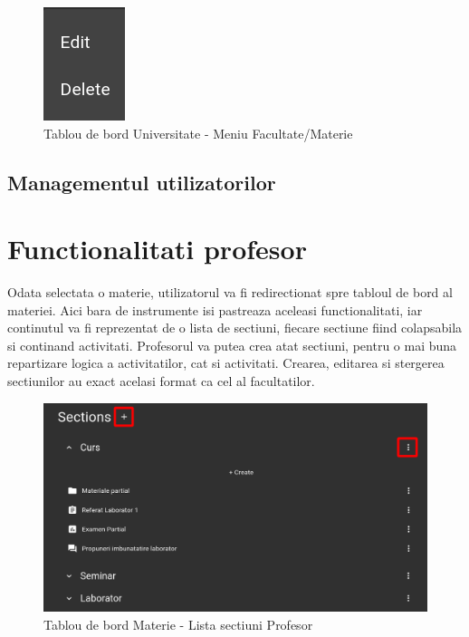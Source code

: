 \documentclass[12pt, a4paper, oneside, romanian]{teza-upb}
\begin{document}
\begin{figure}[H]
\centering
\includegraphics*[width=0.15\columnwidth]{tablou-de-bord-universitate-meniu-facultate}
\caption{Tablou de bord Universitate - Meniu Facultate/Materie}
\label{tablou-de-bord-universitate-meniu-facultate}
\end{figure}


\subsection{Managementul utilizatorilor}


\section{Functionalitati profesor}

Odata selectata o materie, utilizatorul va fi redirectionat spre tabloul de bord al materiei. Aici bara de instrumente isi pastreaza aceleasi functionalitati, iar continutul va fi reprezentat de o lista de sectiuni, fiecare sectiune fiind colapsabila si continand activitati. Profesorul va putea crea atat sectiuni, pentru o mai buna repartizare logica a activitatilor, cat si activitati. Crearea, editarea si stergerea sectiunilor au exact acelasi format ca cel al facultatilor.

\begin{figure}[H]
\centering
\includegraphics*[width=\columnwidth]{tablou-de-bord-materie-lista-sectiuni-profesor}
\caption{Tablou de bord Materie - Lista sectiuni Profesor}
\label{tablou-de-bord-materie-lista-sectiuni-profesor}
\end{figure}
\end{document}
